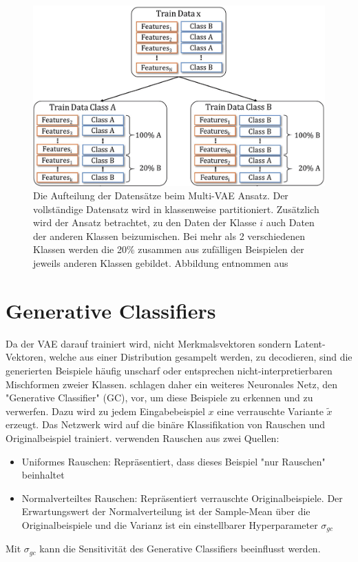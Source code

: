 \begin{figure}[hbt]
  \centering
  \includegraphics[width=.6\textwidth]{gfx/methodology/ds_split}
  \caption{Die Aufteilung der Datensätze beim Multi-VAE Ansatz. Der vollständige Datensatz wird in klassenweise partitioniert. Zusätzlich wird der Ansatz betrachtet, zu den Daten der Klasse $i$ auch Daten der anderen Klassen beizumischen. Bei mehr als 2 verschiedenen Klassen werden die 20\% zusammen aus zufälligen Beispielen der jeweils anderen Klassen gebildet. Abbildung entnommen aus \cite{Moreno-Barea2020}}
  \label{fig:dataset_parts}
\end{figure}



\section{Generative Classifiers}
Da der VAE darauf trainiert wird, nicht Merkmalsvektoren sondern Latent-Vektoren, welche aus einer Distribution gesampelt werden, zu decodieren, sind die generierten Beispiele häufig unscharf oder entsprechen nicht-interpretierbaren Mischformen zweier Klassen. \cite{Moreno-Barea2020} schlagen daher ein weiteres Neuronales Netz, den "Generative Classifier" (GC), vor, um diese Beispiele zu erkennen und zu verwerfen. Dazu wird zu jedem Eingabebeispiel $x$ eine verrauschte Variante $\tilde{x}$ erzeugt. Das Netzwerk wird auf die binäre Klassifikation von Rauschen und Originalbeispiel trainiert. \cite{Moreno-Barea2020} verwenden Rauschen aus zwei Quellen:
\begin{itemize}
  \item Uniformes Rauschen: Repräsentiert, dass dieses Beispiel "nur Rauschen" beinhaltet
  \item Normalverteiltes Rauschen: Repräsentiert verrauschte Originalbeispiele. Der Erwartungswert der Normalverteilung ist der Sample-Mean über die Originalbeispiele und die Varianz ist ein einstellbarer Hyperparameter $\sigma_{gc}$
\end{itemize}
Mit $\sigma_{gc}$ kann die Sensitivität des Generative Classifiers beeinflusst werden.\\

